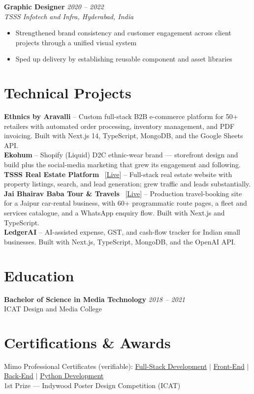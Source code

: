 \documentclass[10pt,a4paper]{article}
\begin{document}
\textbf{Graphic Designer} \hfill \textit{2020 -- 2022} \\
\textit{TSSS Infotech and Infra, Hyderabad, India}
\begin{itemize}
    \item Strengthened brand consistency and customer engagement across client projects through a unified visual system
    \item Sped up delivery by establishing reusable component and asset libraries
\end{itemize}

\section*{Technical Projects}
\textbf{Ethnics by Aravalli} -- Custom full-stack B2B e-commerce platform for 50+ retailers with automated order processing, inventory management, and PDF invoicing. Built with Next.js 14, TypeScript, MongoDB, and the Google Sheets API. \\[2pt]
\textbf{Ekohum} -- Shopify (Liquid) D2C ethnic-wear brand --- storefront design and build plus the social-media marketing that grew its engagement and following. \\[2pt]
\textbf{TSSS Real Estate Platform} \, [\href{https://tsss-realestate.vercel.app}{Live}] -- Full-stack real estate website with property listings, search, and lead generation; grew traffic and leads substantially. \\[2pt]
\textbf{Jai Bhairav Baba Tour \& Travels} \, [\href{https://jaibhairavbaba.com}{Live}] -- Production travel-booking site for a Jaipur car-rental business, with 60+ programmatic route pages, a fleet and services catalogue, and a WhatsApp enquiry flow. Built with Next.js and TypeScript. \\[2pt]
\textbf{LedgerAI} -- AI-assisted expense, GST, and cash-flow tracker for Indian small businesses. Built with Next.js, TypeScript, MongoDB, and the OpenAI API.

\section*{Education}
\textbf{Bachelor of Science in Media Technology} \hfill \textit{2018 -- 2021} \\
ICAT Design and Media College

\section*{Certifications \& Awards}
Mimo Professional Certificates (verifiable):
\href{https://www.virtualbadge.io/certificate-validator?credential=cdf80377-92f4-4b32-8971-c8d76a689758}{Full-Stack Development} $|$
\href{https://www.virtualbadge.io/certificate-validator?credential=dc2d7a69-bed9-42f9-a311-e88253bec94f}{Front-End} $|$
\href{https://www.virtualbadge.io/certificate-validator?credential=f1ac96bf-114a-420f-8b9c-a06ce73ef51e}{Back-End} $|$
\href{https://www.virtualbadge.io/certificate-validator?credential=5c9f1f58-a842-490d-8f10-b07ebfb95469}{Python Development}
\\
1st Prize --- Indywood Poster Design Competition (ICAT)
\end{document}
